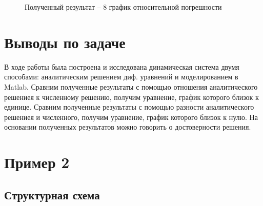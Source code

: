 \documentclass[12pt]{article}
\begin{document}
\begin{figure}[h]
	\caption{Полученный результат --  8 график относительной погрешности}
\end{figure}


	\newpage 
		\clearpage
	\section{Выводы по задаче}
	В ходе работы была построена и исследована динамическая система двумя способами: аналитическим решением диф. уравнений и моделированием в Matlab. Сравним полученные результаты с помощью отношения аналитического решениея к численному решению, получим уравнение, график которого близок к единице. Сравним полученные результаты с помощью разности аналитического решениея и численного, получим уравнение, график которого близок к нулю. На основании полученных результатов можно говорить о достоверности решения. 
	\newpage 
		\clearpage
	\section{Пример 2}
	\subsection{Структурная схема}
	\begin{figure}[h]
	\end{figure}
	\clearpage
\end{document}
